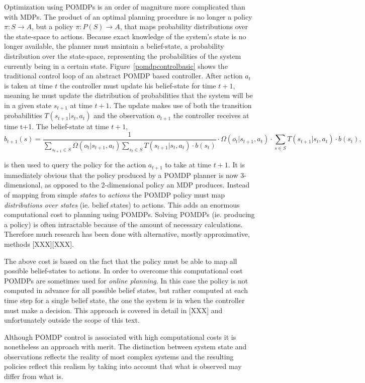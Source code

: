 Optimization using POMDPs is an order of magniture more complicated than with MDPs. The product of an optimal planning procedure is no longer a policy $\pi: S \rightarrow A$, but a policy $\pi: P(S) \rightarrow A$, that maps probability distributions over the state-space to actions. Because exact knowledge of the system's state is no longer available, the planner must maintain a belief-state, a probability distribution over the state-space, representing the probabilities of the system currently being in a certain state. Figure~\ref{pomdpcontrolbasic} shows the traditional control loop of an abstract POMDP based controller. After action $a_t$ is taken at time $t$ the controller must update his belief-state for time $t+1$, meaning he must update the distribution of probabilities that the system will be in a given state $s_{t+1}$ at time $t+1$. The update makes use of both the transition probabilities $T(s_{t+1}|s_t,a_t)$ and the observation $o_{t+1}$ the controller receives at time {t+1}. The belief-state at time $t+1$,
\[
b_{t+1}(s) = \frac{1}{\sum_{s_{t+1} \in S} \Omega (o_t|s_{t+1},a_t) \sum_{s_t \in S} T(s_{t+1}|s_t,a_t)\cdot b(s_t)} \cdot \Omega (o_t|s_{t+1},a_t) \cdot \sum_{s \in S} T(s_{t+1}|s_t,a_t) \cdot b(s_t),
\]

is then used to query the policy for the action $a_{t+1}$ to take at time $t+1$. It is immediately obvious that the policy produced by a POMDP planner is now 3-dimensional, as opposed to the 2-dimensional policy an MDP produces. Instead of mapping from simple \textit{states} to \textit{actions} the POMDP policy must map \textit{distributions over states} (ie. belief states) to actions. This adds an enormous computational cost to planning using POMDPs. Solving POMDPs (ie. producing a policy) is often intractable because of the amount of necessary calculations. Therefore much research has been done with alternative, mostly approximative, methods \cite{Hansen98}[XXX][XXX].

The above cost is based on the fact that the policy must be able to map all possible belief-states to actions. In order to overcome this computational cost POMDPs are sometimes used for \textit{online planning}. In this case the policy is not computed in advance for all possible belief states, but rather computed at each time step for a single belief state, the one the system is in when the controller must make a decision. This approach is covered in detail in [XXX] and unfortunately outside the scope of this text.

Although POMDP control is associated with high computational costs it is nonetheless an approach with merit. The distinction between system state and observations reflects the reality of most complex systems and the resulting policies reflect this realism by taking into account that what is observed may differ from what is.

